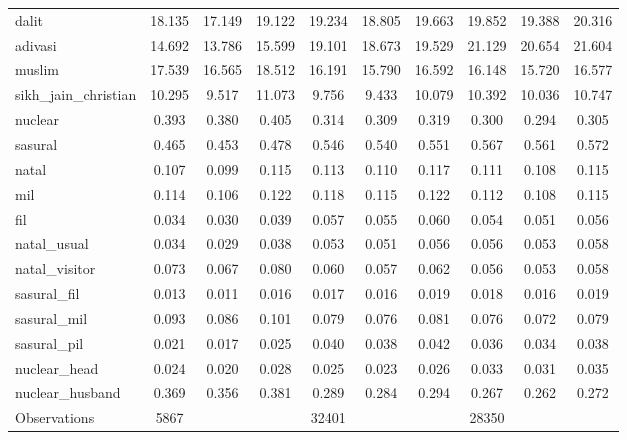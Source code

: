 {\begin{tabular}{l*{3}{ccc}}
dalit               &      18.135&      17.149&      19.122&      19.234&      18.805&      19.663&      19.852&      19.388&      20.316\\
adivasi             &      14.692&      13.786&      15.599&      19.101&      18.673&      19.529&      21.129&      20.654&      21.604\\
muslim              &      17.539&      16.565&      18.512&      16.191&      15.790&      16.592&      16.148&      15.720&      16.577\\
sikh\_jain\_christian &      10.295&       9.517&      11.073&       9.756&       9.433&      10.079&      10.392&      10.036&      10.747\\
nuclear             &       0.393&       0.380&       0.405&       0.314&       0.309&       0.319&       0.300&       0.294&       0.305\\
sasural             &       0.465&       0.453&       0.478&       0.546&       0.540&       0.551&       0.567&       0.561&       0.572\\
natal               &       0.107&       0.099&       0.115&       0.113&       0.110&       0.117&       0.111&       0.108&       0.115\\
mil                 &       0.114&       0.106&       0.122&       0.118&       0.115&       0.122&       0.112&       0.108&       0.115\\
fil                 &       0.034&       0.030&       0.039&       0.057&       0.055&       0.060&       0.054&       0.051&       0.056\\
natal\_usual         &       0.034&       0.029&       0.038&       0.053&       0.051&       0.056&       0.056&       0.053&       0.058\\
natal\_visitor       &       0.073&       0.067&       0.080&       0.060&       0.057&       0.062&       0.056&       0.053&       0.058\\
sasural\_fil         &       0.013&       0.011&       0.016&       0.017&       0.016&       0.019&       0.018&       0.016&       0.019\\
sasural\_mil         &       0.093&       0.086&       0.101&       0.079&       0.076&       0.081&       0.076&       0.072&       0.079\\
sasural\_pil         &       0.021&       0.017&       0.025&       0.040&       0.038&       0.042&       0.036&       0.034&       0.038\\
nuclear\_head        &       0.024&       0.020&       0.028&       0.025&       0.023&       0.026&       0.033&       0.031&       0.035\\
nuclear\_husband     &       0.369&       0.356&       0.381&       0.289&       0.284&       0.294&       0.267&       0.262&       0.272\\
\hline
Observations        &        5867&            &            &       32401&            &            &       28350&            &            \\
\hline\hline
\end{tabular}
}
